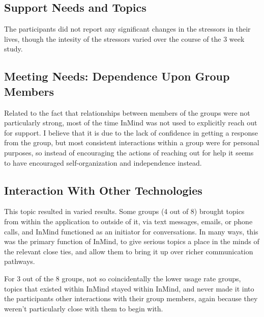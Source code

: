   \subsection{Support Needs and Topics}
    The participants did not report any significant changes in the stressors
    in their lives,
    though the intesity of the stressors varied over the course of the 3 week study.
  
  \subsection{Meeting Needs: Dependence Upon Group Members}
    Related to the fact that relationships between members of the groups
    were not particularly strong,
    most of the time InMind was not used to explicitly reach out for support.
    I believe that it is due to the lack of confidence in getting a response
    from the group,
    but most consistent interactions within a group were for personal purposes,
    so instead of encouraging the actions of reaching out for help
    it seems to have encouraged self-organization and independence instead.

  \subsection{Interaction With Other Technologies}
    This topic resulted in varied results.
    Some groups (4 out of 8) brought topics from within the application to outside
    of it, via text messages, emails, or phone calls,
    and InMind functioned as an initiator for conversations.
    In many ways, this was the primary function of InMind,
    to give serious topics a place in the minds of the relevant close ties,
    and allow them to bring it up over richer communication pathways.

    For 3 out of the 8 groups, not so coincidentally the lower usage rate groups,
    topics that existed within InMind stayed within InMind,
    and never made it into the participants other interactions with their group
    members, again because they weren't particularly close with them to begin with.


